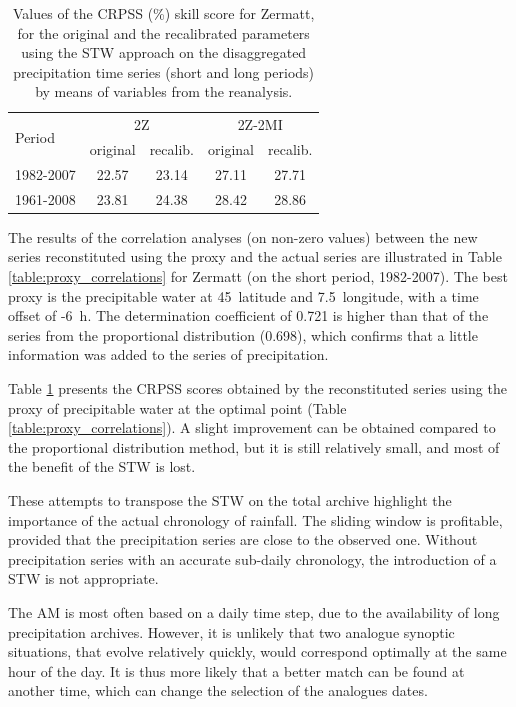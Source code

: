 \documentclass[hess]{copernicus}
\begin{document}
\begin{table}[htb]
	\caption{Values of the CRPSS (\%) skill score for Zermatt, for the original and the recalibrated parameters using the STW approach on the disaggregated precipitation time series (short and long periods) by means of variables from the reanalysis.}
	\begin{center}
		\begin{tabular}{l c c c c}
			\hline
			\multirow{2}{*}{Period} & \multicolumn{2}{c}{2Z} & \multicolumn{ 2}{c}{2Z-2MI} \\
			& original & recalib. & original & recalib. \\
			\hline
			1982-2007 & 22.57 & 23.14 & 27.11 & 27.71 \\
			1961-2008 & 23.81 & 24.38 & 28.42 & 28.86 \\
			\hline
		\end{tabular}
	\end{center}
	\label{table:proxy_CRPSS}
\end{table}

The results of the correlation analyses (on non-zero values) between the new series reconstituted using the proxy and the actual series are illustrated in Table \ref{table:proxy_correlations} for Zermatt (on the short period, 1982-2007). The best proxy is the precipitable water at 45\textdegree\ latitude and 7.5\textdegree\ longitude, with a time offset of -6~h. The determination coefficient of 0.721 is higher than that of the series from the proportional distribution (0.698), which confirms that a little information was added to the series of precipitation.

Table \ref{table:proxy_CRPSS} presents the CRPSS scores obtained by the reconstituted series using the proxy of precipitable water at the optimal point (Table \ref{table:proxy_correlations}). A slight improvement can be obtained compared to the proportional distribution method, but it is still relatively small, and most of the benefit of the STW is lost.

These attempts to transpose the STW on the total archive highlight the importance of the actual chronology of rainfall. The sliding window is profitable, provided that the precipitation series are close to the observed one. Without precipitation series with an accurate sub-daily chronology, the introduction of a STW is not appropriate.


\conclusions  %

The AM is most often based on a daily time step, due to the availability of long precipitation archives. However, it is unlikely that two analogue synoptic situations, that evolve relatively quickly, would correspond optimally at the same hour of the day. It is thus more likely that a better match can be found at another time, which can change the selection of the analogues dates.
\end{document}
